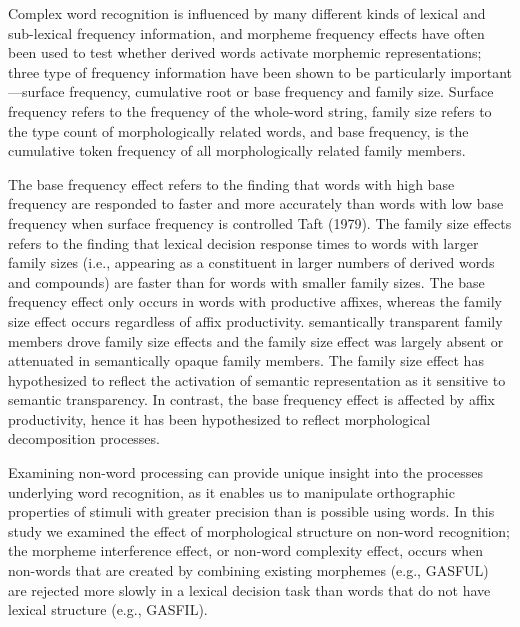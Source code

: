 \documentclass[review]{elsarticle}
\begin{document}
Complex word recognition is influenced by many different kinds of lexical and sub-lexical frequency  information, and morpheme frequency effects have often been used to test whether derived words activate morphemic representations; three type of frequency information have been shown to be particularly important—surface frequency, cumulative root or base frequency and family size. Surface frequency refers to the frequency of the whole-word string, family size refers to the type count of morphologically related words, and base frequency, is the cumulative token frequency of all morphologically related family members. 

The base frequency effect refers to the finding that words with high base frequency are responded to faster and more accurately than words with low base frequency when surface frequency is controlled  Taft (1979).  The family size effects refers to the finding that  lexical decision response times to words with larger family sizes (i.e., appearing as a constituent in larger numbers of derived words and compounds) are faster than for words with smaller family sizes. The base frequency effect only occurs in words with productive affixes, whereas the family size effect occurs regardless of affix productivity. semantically transparent family members drove family size effects and the family size effect was largely absent or attenuated in semantically opaque family members. The family size effect has hypothesized to reflect the activation of semantic representation as it sensitive to semantic transparency.  In contrast, the base frequency effect is affected by affix productivity, hence it has been hypothesized to reflect morphological decomposition processes.

Examining non-word processing can provide unique insight into the processes underlying word recognition, as it enables us to manipulate  orthographic properties of stimuli with greater precision than is possible using words.  In this study we examined the effect of morphological structure on non-word recognition; the morpheme interference effect, or non-word complexity effect, occurs when non-words that are created by combining existing morphemes (e.g., GASFUL) are rejected more slowly in a lexical decision task than words that do not have lexical structure (e.g., GASFIL).


	



\end{document}
